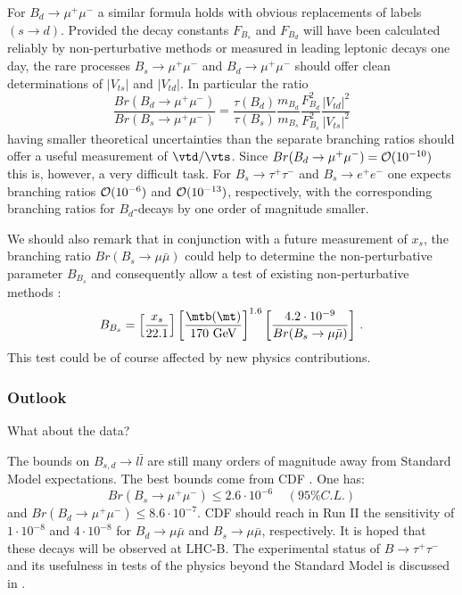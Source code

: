 For $B_d\to\mu^+\mu^-$ a similar formula holds with obvious
replacements of labels $(s\to d)$. Provided the decay constants
$F_{B_s}$ and $F_{B_d}$ will have been calculated reliably by
non-perturbative methods or measured in leading leptonic decays one
day, the rare processes $B_{s}\to\mu^+\mu^-$ and $B_{d}\to\mu^+\mu^-$
should offer clean determinations of $|V_{ts}|$ and $|V_{td}|$. 
In particular the ratio
\begin{equation}
\frac{Br(B_d\to\mu^+\mu^-)}{Br(B_s\to\mu^+\mu^-)}
=\frac{\tau(B_d)}{\tau(B_s)}
\frac{m_{B_d}}{m_{B_s}}
\frac{F^2_{B_d}}{F^2_{B_s}}
\frac{|V_{td}|^2}{|V_{ts}|^2}
\end{equation}
having smaller theoretical uncertainties than the separate
branching ratios should offer a useful measurement of
$\vtd/\vts$. Since $Br(B_d\to\mu^+\mu^-)= {\cal O}(10^{-10})$
this is, however, a very difficult task. For $B_s \to \tau^+\tau^-$
and $B_s\to e^+e^-$ one expects branching ratios ${\cal O}(10^{-6})$
and ${\cal O}(10^{-13})$, respectively, with the corresponding branching 
ratios for $B_d$-decays by one order of magnitude smaller.

We should also remark that in conjunction with a future measurement of 
$x_s$, the branching
ratio $Br(B_s\to \mu\bar\mu)$ could help to determine 
the non-perturbative parameter $B_{B_s}$ and consequently allow
a test of existing non-perturbative methods \cite{B95}:
\begin{equation}
 B_{B_s}=
\left[\frac{x_s}{22.1}\right]
\left[\frac{\mtb(\mt)}{170~\mbox{GeV}} \right]^{1.6} 
\left[\frac{4.2\cdot 10^{-9}}{Br(B_s\to \mu\bar\mu)} \right] \,.
\end{equation}
This test could be of course affected by new physics contributions.
\subsubsection{Outlook}
What about the data?

The bounds on $B_{s,d}\to l\bar l$ are still
many orders of magnitude away from Standard Model expectations.
The best bounds come from CDF \cite{CDFMU}. One has:
\begin{equation}\label{MUBOUND}
Br(B_s\to\mu^+\mu^-)\le 
2.6\cdot 10^{-6}~~~~~(95\% C.L.)
\end{equation}
and $Br(B_d\to\mu^+\mu^-)\le 8.6\cdot 10^{-7}$.
CDF should reach in Run II the
sensitivity of $1\cdot 10^{-8}$ and $4\cdot 10^{-8}$ for
$B_d\to \mu\bar\mu$ and $B_s\to \mu\bar\mu$, respectively.
It is hoped that these decays will be observed at
LHC-B. The experimental status of $B\to\tau^+\tau^-$ and its
usefulness in tests of the physics beyond the Standard Model
is discussed in \cite{GLN96}.

